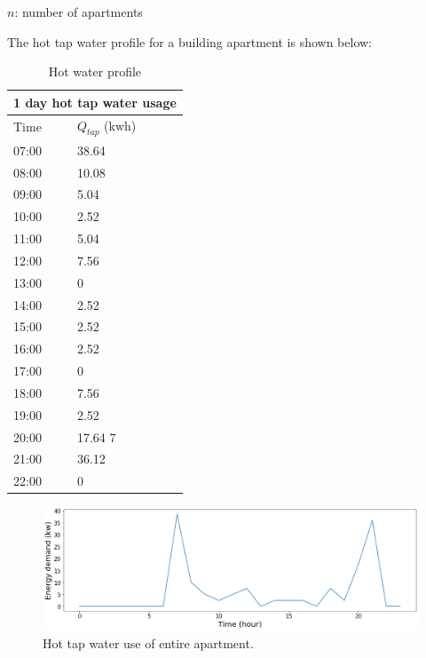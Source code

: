 $n$: number of apartments

The hot tap water profile for a building apartment is shown below:


\begin{table}[h!]
\centering
\begin{tabular}{|p{3cm}|p{3cm}|}
\hline
\multicolumn{2}{|c|}{1 day hot tap water usage} \\
\hline
Time& $Q_{tap}$ (kwh)\\ %
 \hline
 07:00	& 38.64   \\ %
 08:00  & 10.08   \\ %
 09:00	& 5.04    \\ %
 10:00  & 2.52    \\ %
 11:00  & 5.04    \\ %
 12:00  & 7.56    \\ %
 13:00  & 0         \\ %
 14:00  & 2.52   \\ %
 15:00  & 2.52   \\ %
 16:00  & 2.52   \\ %
 17:00  & 0        \\ %
 18:00  & 7.56   \\ %
 19:00  & 2.52  \\ %
 20:00  & 17.64 7\\ %
 21:00  & 36.12 \\ %
 22:00  & 0        \\ %

  \hline
 \end{tabular}
 \caption{Hot water profile}

 \end{table}


\begin{figure}[H]
\centering
\includegraphics[width=1\columnwidth]{pictures/tap water profile of 24 apartments.png}
\caption[Short title]{Hot tap water use of entire apartment.}
\label{fig:htw_entire}
\end{figure}

